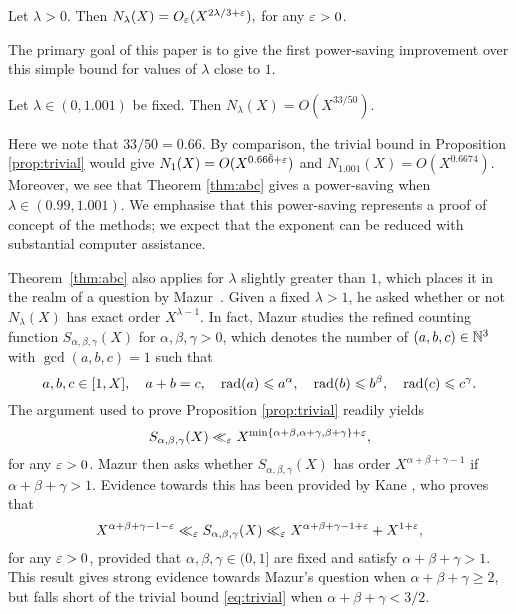 \begin{proposition}\label{prop:trivial}
Let $\lambda>0$. Then
$
N_\lambda(X)=O_\varepsilon( X^{2\lambda/3+\varepsilon}),
$
for any $\varepsilon>0$.
\end{proposition}


The primary goal of this paper is to give the first power-saving improvement over this simple bound for values of $\lambda$ close to $1$.


\begin{theorem}\label{thm:abc}
Let $\lambda\in (0, 1.001)$ be fixed. Then
$N_\lambda(X)=O( X^{33/50})$.
\end{theorem}

Here we note that $33/50=0.66$. By comparison, the trivial bound in Proposition \ref{prop:trivial} would give $N_1(X)=O(X^{0.66\bar{6}+\varepsilon})$ and $N_{1.001}(X)=O(X^{0.6674})$. Moreover, we see that Theorem \ref{thm:abc} gives a power-saving when $\lambda\in (0.99,1.001)$. We emphasise that this power-saving represents a proof of concept of the methods; we expect that
 the exponent can be reduced with substantial computer assistance.


 Theorem~\ref{thm:abc} also applies for $\lambda$ slightly greater than $1$,
 which places it in the realm of a question by Mazur~\cite{mazur}.
Given a fixed $\lambda>1$, he asked whether or not
$ N_\lambda(X)$ has exact order
 $ X^{\lambda-1}$.
 In fact, Mazur studies
 the refined counting function
 $S_{\alpha,\beta,\gamma}(X)$
 for $\alpha,\beta,\gamma>0$, which  denotes the number of
 $(a,b,c)\in \mathbb{N}^3$
with $\gcd(a,b,c)=1$  such that
 $$
 a,b,c\in [1,X], \quad a+b=c, \quad \operatorname{rad}(a)\leqslant a^\alpha, \quad
 \operatorname{rad}(b)\leqslant b^\beta, \quad
 \operatorname{rad}(c)\leqslant c^\gamma.
 $$
The argument used to prove Proposition \ref{prop:trivial} readily yields
\begin{equation}\label{eq:trivial}
 S_{\alpha,\beta,\gamma}(X)\ll_\varepsilon X^{\min\{\alpha+\beta , \alpha+\gamma , \beta+\gamma\}+\varepsilon},
\end{equation}
for any $\varepsilon>0$. Mazur then asks whether
 $S_{\alpha,\beta,\gamma}(X)$  has order $X^{\alpha+\beta+\gamma-1}$
if  $\alpha+\beta+\gamma>1$.
  Evidence towards this has been provided by Kane
   \cite[Theorems~1 and 2]{kane}, who proves that
$$
X^{\alpha+\beta+\gamma-1-\varepsilon}\ll_\varepsilon
S_{\alpha,\beta,\gamma}(X)\ll_\varepsilon
X^{\alpha+\beta+\gamma-1+\varepsilon}+X^{1+\varepsilon},
$$
for any $\varepsilon>0$,
provided that $\alpha,\beta,\gamma\in (0,1]$ are fixed and satisfy $\alpha+\beta+\gamma>1$.
This result gives strong evidence towards Mazur's question when
$\alpha+\beta+\gamma\geq 2$, but falls short of the trivial bound
\eqref{eq:trivial}
when $\alpha+\beta+\gamma<3/2$.



